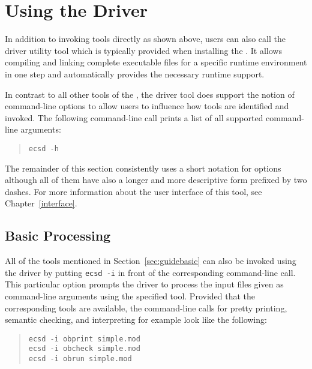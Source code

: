 \section{Using the \ecs{} Driver}\label{sec:guidedriver}

In addition to invoking tools directly as shown above, users can also call the  driver utility tool which is typically provided when installing the \ecs{}.
It allows compiling and linking complete executable files for a specific runtime environment in one step and automatically provides the necessary runtime support.


In contrast to all other tools of the \ecs{}, the driver tool does support the notion of command-line options to allow users to influence how tools are identified and invoked.
The following command-line call prints a list of all supported command-line arguments:

\begin{quote}\begin{verbatim}
ecsd -h
\end{verbatim}\end{quote}

The remainder of this section consistently uses a short notation for options although all of them have also a longer and more descriptive form prefixed by two dashes.
\ifbook For more information about the user interface of this tool, see Chapter~\ref{interface}. \fi

\subsection{Basic Processing}

All of the tools mentioned in Section~\ref{sec:guidebasic} can also be invoked using the \ecs{} driver by putting \texttt{ecsd~-i} in front of the corresponding command-line call.
This particular option prompts the driver to process the input files given as command-line arguments using the specified tool.
Provided that the corresponding tools are available, the command-line calls for pretty printing, semantic checking, and interpreting for example look like the following:

\begin{quote}\begin{verbatim}
ecsd -i obprint simple.mod
ecsd -i obcheck simple.mod
ecsd -i obrun simple.mod
\end{verbatim}\end{quote}

